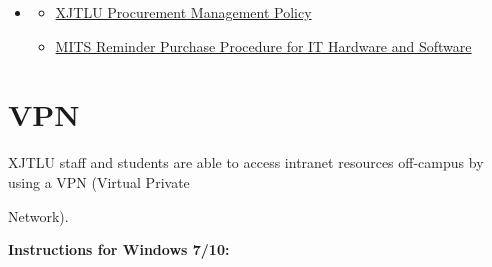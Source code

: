\documentclass[
]{book}
\providecommand{\tightlist}{%
  \setlength{\itemsep}{0pt}\setlength{\parskip}{0pt}}
\newenvironment{rmdblock}[1]
  {\begin{shaded*}
  \begin{itemize}
  \renewcommand{\labelitemi}{
    \raisebox{-.7\height}[0pt][0pt]{
      {\setkeys{Gin}{width=2em,keepaspectratio}\texttt{[image: image/\#1]}}
    }
  }
  \item
  }
  {
  \end{itemize}
  \end{shaded*}
  }
\newenvironment{rmdrd}
  {\begin{rmdblock}{rd}}
  {\end{rmdblock}}
\begin{document}
\begin{rmdrd}
\begin{itemize}
\tightlist
\item
  \href{https://box.xjtlu.edu.cn/lib/883faf64-eff0-432e-8426-462815438e4c/file/UC/UC\%20for\%20Staff/201910/Notice/Procurement\%20Management\%20Policy.pdf}{XJTLU Procurement Management Policy}
\item
  \href{https://box.xjtlu.edu.cn/smart-link/985f3f45-5d2c-4aff-8b83-0f117692e508/}{MITS Reminder Purchase Procedure for IT Hardware and Software}
\end{itemize}
\end{rmdrd}

\hypertarget{vpn}{%
\section{VPN}\label{vpn}}

XJTLU staff and students are able to access intranet resources off-campus by using a VPN (Virtual Private

Network).

\textbf{Instructions for Windows 7/10:}
\end{document}
